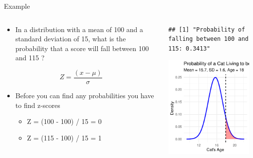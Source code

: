 \documentclass[
  ignorenonframetext,
]{beamer}
\providecommand{\tightlist}{%
  \setlength{\itemsep}{0pt}\setlength{\parskip}{0pt}}
\begin{document}
\begin{frame}[fragile]{Example}
\label{example-5}
\begin{columns}[T]
\begin{column}{0.5\textwidth}
\begin{itemize}
\tightlist
\item
  In a distribution with a mean of 100 and a standard deviation of 15,
  what is the probability that a score will fall between 100 and 115 ?
\end{itemize}

\[ Z = \frac{(x - \mu)}{\sigma} \]

\vspace{1cm}

\begin{itemize}
\tightlist
\item
  Before you can find any probabilities you have to find z-scores

  \begin{itemize}
  \tightlist
  \item
    Z = (100 - 100) / 15 = 0
  \item
    Z = (115 - 100) / 15 = 1
  \end{itemize}
\end{itemize}
\end{column}

\begin{column}{0.5\textwidth}
\begin{verbatim}
## [1] "Probability of falling between 100 and 115: 0.3413"
\end{verbatim}

\includegraphics{M5-Hypothesis-Testing,-Probability-and-Distribution_files/figure-beamer/unnamed-chunk-21-1.pdf}
\end{column}
\end{columns}
\end{frame}
\end{document}

